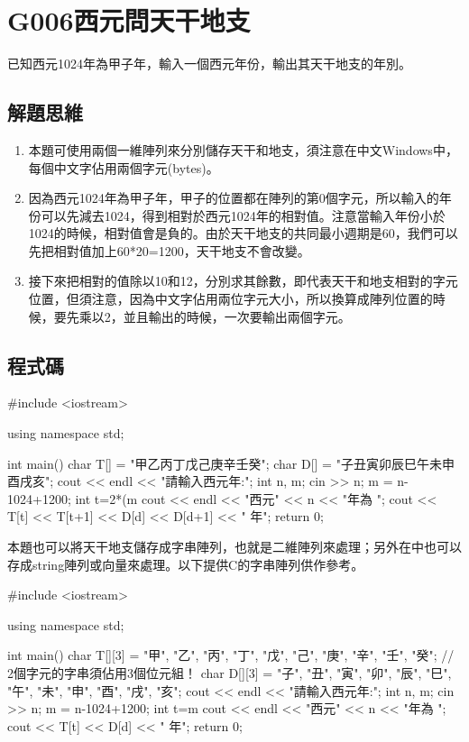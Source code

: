 \section{G006西元問天干地支}
已知西元1024年為甲子年，輸入一個西元年份，輸出其天干地支的年別。

\subsection{解題思維}
\begin{enumerate}
\item 本題可使用兩個一維陣列來分別儲存天干和地支，須注意在中文Windows中，每個中文字佔用兩個字元(bytes)。
\item 因為西元1024年為甲子年，甲子的位置都在陣列的第0個字元，所以輸入的年份可以先減去1024，得到相對於西元1024年的相對值。注意當輸入年份小於1024的時候，相對值會是負的。由於天干地支的共同最小週期是60，我們可以先把相對值加上60*20=1200，天干地支不會改變。
\item 接下來把相對的值除以10和12，分別求其餘數，即代表天干和地支相對的字元位置，但須注意，因為中文字佔用兩位字元大小，所以換算成陣列位置的時候，要先乘以2，並且輸出的時候，一次要輸出兩個字元。
\end{enumerate}
\subsection{程式碼}
\begin{cppcode}
#include <iostream>

using namespace std;

int main()
{
	char T[] = "甲乙丙丁戊己庚辛壬癸";
	char D[] = "子丑寅卯辰巳午未申酉戌亥";
	cout << endl << "請輸入西元年:";
	int n, m;
	cin >> n;
	m = n-1024+1200;
	int t=2*(m%
	cout << endl << "西元" << n << "年為 ";
	cout << T[t] << T[t+1] << D[d] << D[d+1] << " 年";
	return 0;
}
\end{cppcode}

\noindent 本題也可以將天干地支儲存成字串陣列，也就是二維陣列來處理；另外在\cc{}中也可以
存成string陣列或向量來處理。以下提供C的字串陣列供作參考。
\begin{cppcode}
	#include <iostream>
	
	using namespace std;
	
	int main()
	{
		char T[][3] = {"甲", "乙", "丙", "丁", "戊", 
			"己", "庚", "辛", "壬", "癸"}; // 2個字元的字串須佔用3個位元組！
		char D[][3] = {"子", "丑", "寅", "卯", "辰", "巳",
			"午", "未", "申", "酉", "戌", "亥"};
		cout << endl << "請輸入西元年:";
		int n, m;
		cin >> n;
		m = n-1024+1200;
		int t=m%
		cout << endl << "西元" << n << "年為 ";
		cout << T[t] << D[d] << " 年";
		return 0;
	}
\end{cppcode}
